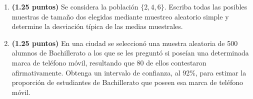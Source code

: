 
\begin{enumerate}[label=\alph*)]
\item \textbf{(1.25 puntos)} Se considera la población $\{2,4,6\}$. Escriba todas las posibles muestras de tamaño dos elegidas mediante muestreo aleatorio simple y determine la desviación típica de las medias muestrales.
\item \textbf{(1.25 puntos)} En una ciudad se seleccionó una muestra aleatoria de 500 alumnos de Bachillerato a los que se les preguntó si poseían una determinada marca de teléfono móvil, resultando que 80 de ellos contestaron afirmativamente. Obtenga un intervalo de confianza, al 92\%, para estimar la proporción de estudiantes de Bachillerato que poseen esa marca de teléfono móvil.
\end{enumerate}
